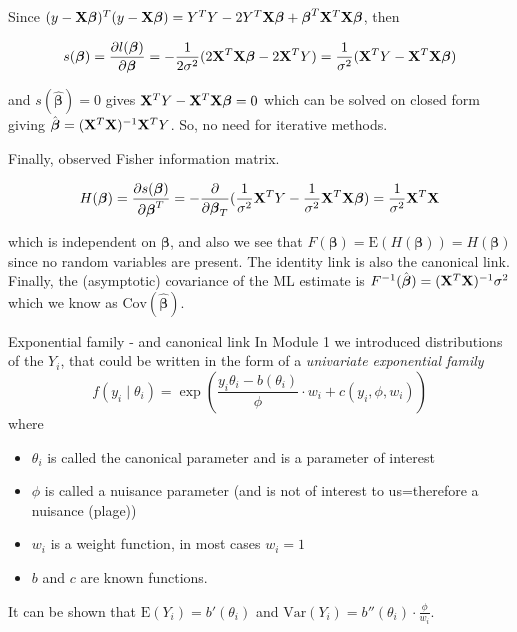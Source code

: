 \documentclass[
  ignorenonframetext,
]{beamer}
\begin{document}
\begin{frame}
Since
\((y-{\bf X}\boldsymbol{\beta})^T(y-{\bf X}\boldsymbol{\beta}) = Y^TY - 2Y^T{\bf X}\boldsymbol{\beta} + \boldsymbol{\beta}^T{\bf X}^T{\bf X}\boldsymbol{\beta}\),
then

\[s(\boldsymbol{\beta}) = \frac{\partial l(\boldsymbol{\beta})}{\partial \boldsymbol{\beta}} = -\frac{1}{2\sigma^2}(2{\bf X}^T{\bf X}\boldsymbol{\beta}-2{\bf X}^TY) = \frac{1}{\sigma^2}({\bf X}^TY - {\bf X}^T{\bf X}\boldsymbol{\beta})\]

and \(s(\hat{\boldsymbol{\beta}}) = 0\) gives
\({\bf X}^TY - {\bf X}^T{\bf X}\boldsymbol{\beta} = 0\) which can be
solved on closed form giving
\(\hat{\boldsymbol{\beta}} = ({\bf X}^T{\bf X})^{-1}{\bf X}^TY\). So, no
need for iterative methods.
\end{frame}

\begin{frame}
Finally, observed Fisher information matrix.

\[H(\boldsymbol{\beta}) = \frac{\partial s(\boldsymbol{\beta})}{\partial \boldsymbol{\beta}^T} = -\frac{\partial}{\partial \boldsymbol{\beta}_T}(\frac{1}{\sigma^2}{\bf X}^TY - \frac{1}{\sigma^2}{\bf X}^T{\bf X}\boldsymbol{\beta}) = \frac{1}{\sigma^2}{\bf X}^T{\bf X}\]

which is independent on \(\boldsymbol{\beta}\), and also we see that
\(F(\boldsymbol{\beta})=\text{E}(H(\boldsymbol{\beta}))=H(\boldsymbol{\beta})\)
since no random variables are present. The identity link is also the
canonical link. Finally, the (asymptotic) covariance of the ML estimate
is \(F^{-1}(\hat{\boldsymbol{\beta}})=({\bf X}^T{\bf X})^{-1}\sigma^2\)
which we know as \(\text{Cov}(\hat{\boldsymbol{\beta}})\).
\end{frame}

\begin{frame}{Exponential family - and canonical link}
\protect\hypertarget{exponential-family---and-canonical-link}{}
In Module 1 we introduced distributions of the \(Y_i\), that could be
written in the form of a \emph{univariate exponential family}
\[ f(y_i\mid \theta_i)=\exp \left( \frac{y_i \theta_i-b(\theta_i)}{\phi}\cdot w_i + c(y_i, \phi, w_i) \right) \]
where

\begin{itemize}
\item
  \(\theta_i\) is called the canonical parameter and is a parameter of
  interest
\item
  \(\phi\) is called a nuisance parameter (and is not of interest to
  us=therefore a nuisance (plage))
\item
  \(w_i\) is a weight function, in most cases \(w_i=1\)
\item
  \(b\) and \(c\) are known functions.
\end{itemize}

It can be shown that \(\text{E}(Y_i)=b'(\theta_i)\) and
\(\text{Var}(Y_i)=b''(\theta_i)\cdot \frac{\phi}{w_i}\).
\end{frame}
\end{document}
